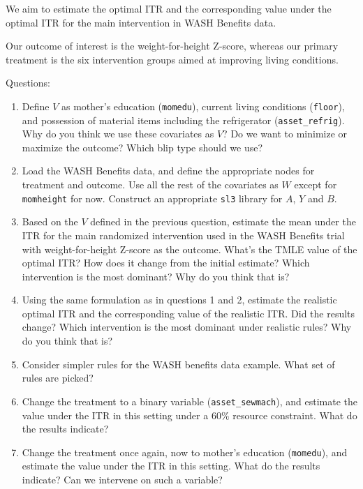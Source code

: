 \documentclass[12pt, krantz2,]{krantz}
\theoremstyle{definition}
\theoremstyle{definition}
\theoremstyle{definition}
\newcommand{\1}{\mathbbm{1}}
\begin{document}
We aim to estimate the optimal ITR and the corresponding value under the optimal
ITR for the main intervention in WASH Benefits data.

Our outcome of interest is the weight-for-height Z-score, whereas our primary
treatment is the six intervention groups aimed at improving living conditions.

Questions:

\begin{enumerate}
\def\labelenumi{\arabic{enumi}.}
\item
  Define \(V\) as mother's education (\texttt{momedu}), current living conditions (\texttt{floor}),
  and possession of material items including the refrigerator (\texttt{asset\_refrig}).
  Why do you think we use these covariates as \(V\)? Do we want to minimize or
  maximize the outcome? Which blip type should we use?
\item
  Load the WASH Benefits data, and define the appropriate nodes for treatment
  and outcome. Use all the rest of the covariates as \(W\) except for
  \texttt{momheight} for now. Construct an appropriate \texttt{sl3} library for \(A\), \(Y\) and
  \(B\).
\item
  Based on the \(V\) defined in the previous question, estimate the mean under
  the ITR for the main randomized intervention used in the WASH Benefits trial
  with weight-for-height Z-score as the outcome. What's the TMLE value of the
  optimal ITR? How does it change from the initial estimate? Which
  intervention is the most dominant? Why do you think that is?
\item
  Using the same formulation as in questions 1 and 2, estimate the realistic
  optimal ITR and the corresponding value of the realistic ITR. Did the results
  change? Which intervention is the most dominant under realistic rules? Why do
  you think that is?
\item
  Consider simpler rules for the WASH benefits data example. What set of rules
  are picked?
\item
  Change the treatment to a binary variable (\texttt{asset\_sewmach}), and estimate the
  value under the ITR in this setting under a \(60\%\) resource constraint. What
  do the results indicate?
\item
  Change the treatment once again, now to mother's education (\texttt{momedu}), and
  estimate the value under the ITR in this setting. What do the results
  indicate? Can we intervene on such a variable?
\end{enumerate}
\end{document}
